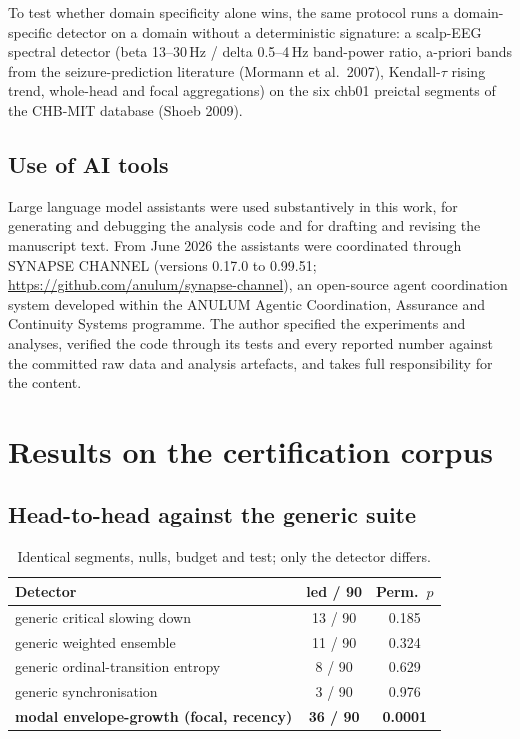 \documentclass[aip,cha,preprint,amsmath,amssymb]{revtex4-2}
\begin{document}
To test whether domain specificity alone wins, the same protocol runs a
domain-specific detector on a domain without a deterministic signature:
a scalp-EEG spectral detector (beta 13--30\,Hz / delta 0.5--4\,Hz
band-power ratio, a-priori bands from the seizure-prediction
literature (Mormann et al.\ 2007), Kendall-$\tau$ rising trend, whole-head and focal
aggregations) on the six chb01 preictal segments of the CHB-MIT
database (Shoeb 2009).

\subsection{Use of AI tools}\label{sec:aiuse}

Large language model assistants were used substantively in this work,
for generating and debugging the analysis code and for drafting and
revising the manuscript text. From June 2026 the assistants were
coordinated through SYNAPSE CHANNEL (versions 0.17.0 to 0.99.51;
\url{https://github.com/anulum/synapse-channel}), an open-source agent
coordination system developed within the ANULUM Agentic Coordination,
Assurance and Continuity Systems programme. The author specified the
experiments and analyses, verified the code through its tests and every
reported number against the committed raw data and analysis artefacts,
and takes full responsibility for the content.

\section{Results on the certification corpus}\label{sec:grid}

\subsection{Head-to-head against the generic suite}

\begin{table}[h!]
\centering
\small
\setlength{\tabcolsep}{3.5pt}
\begin{tabular}{lcc}
\toprule
Detector & led / 90 & Perm.\ $p$ \\
\midrule
generic critical slowing down & 13 / 90 & 0.185 \\
generic weighted ensemble & 11 / 90 & 0.324 \\
generic ordinal-transition entropy & 8 / 90 & 0.629 \\
generic synchronisation & 3 / 90 & 0.976 \\
\textbf{modal envelope-growth (focal, recency)} & \textbf{36 / 90} & \textbf{0.0001} \\
\bottomrule
\end{tabular}
\caption{Identical segments, nulls, budget and test; only the detector
differs.}
\label{tab:headtohead}
\end{table}
\end{document}
